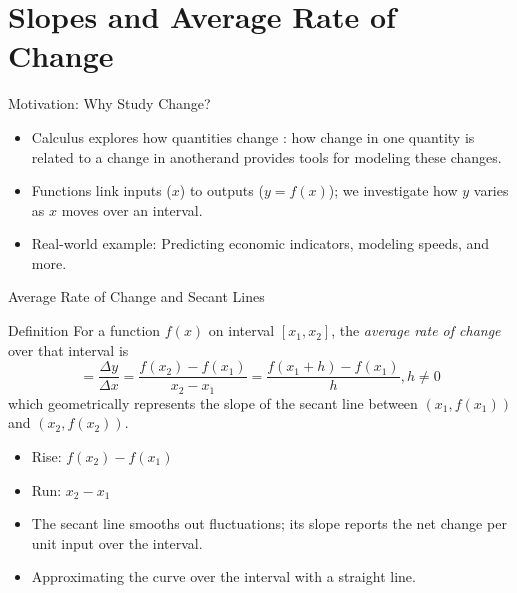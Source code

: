 \documentclass{beamer}
\begin{document}
\section{Slopes and Average Rate of Change}

\begin{frame}{Motivation: Why Study Change?}
  \begin{itemize}
    \item Calculus explores how quantities change : how change in one quantity is related to a change in anotherand provides tools for modeling these changes.
    \item Functions link inputs ($x$) to outputs ($y=f(x)$); we investigate how $y$ varies as $x$ moves over an interval.
    \item Real-world example: Predicting economic indicators, modeling speeds, and more.
  \end{itemize}
\end{frame}

\begin{frame}{Average Rate of Change and Secant Lines}
  \begin{block}{Definition}
    For a function $f(x)$ on interval $[x_{1},x_{2}]$, the \emph{average rate of change} over that interval is
    \[ 
      = \frac{\Delta y}{\Delta x} = \frac{f(x_{2})-f(x_{1})}{x_{2}-x_{1}} = \frac{f(x_{1}+h) - f(x_{1})}{h}, h \neq 0
    \]
    which geometrically represents the slope of the secant line between $(x_{1},f(x_{1}))$ and $(x_{2},f(x_{2}))$.
  \end{block}
  \begin{itemize}
    \item Rise: $f(x_{2})-f(x_{1})$
    \item Run: $x_{2}-x_{1}$
    \item The secant line smooths out fluctuations; its slope reports the net change per unit input over the interval.
    \item Approximating the curve over the interval with a straight line. 
  \end{itemize}
\end{frame}
\end{document}
